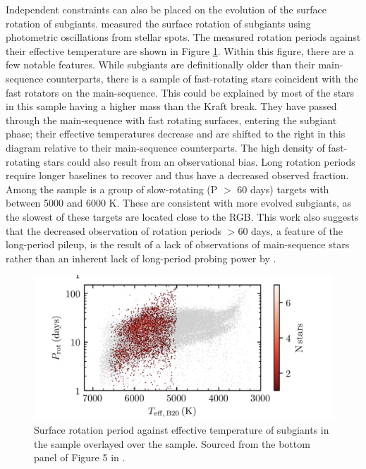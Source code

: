Independent constraints can also be placed on the evolution of the surface rotation of subgiants.
\citet{santos_surface_2021} measured the surface rotation of  subgiants using photometric oscillations from stellar spots.
The measured rotation periods against their effective temperature are shown in Figure \ref{fig:subgiant_surface}.
Within this figure, there are a few notable features.
While subgiants are definitionally older than their main-sequence counterparts, there is a sample of fast-rotating stars coincident with the fast rotators on the main-sequence.
This could be explained by most of the stars in this sample having a higher mass than the Kraft break.
They have passed through the main-sequence with fast rotating surfaces, entering the subgiant phase; their effective temperatures decrease and are shifted to the right in this diagram relative to their main-sequence counterparts.
The high density of fast-rotating stars could also result from an observational bias.
Long rotation periods require longer baselines to recover and thus have a decreased observed fraction.
Among the sample is a group of slow-rotating (P $>$ 60 days) targets with \teff{} between 5000 and 6000 K.
These are consistent with more evolved subgiants, as the slowest of these targets are located close to the RGB.
This work also suggests that the decreased observation of rotation periods $>$60 days, a feature of the long-period pileup, is the result of a lack of observations of main-sequence stars rather than an inherent lack of long-period probing power by \kepler. 

\begin{figure}[h]
    \includegraphics[width=\textwidth]{Figures/intro_figures/subgiant_surface.png}
    \caption[Surface rotation period distribution of subgiant stars.]{Surface rotation period against effective temperature of subgiants in the \citet{santos_surface_2021} sample overlayed over the \kepler{} \citet{mcquillan_rotation_2014} sample. 
    Sourced from the bottom panel of Figure 5 in \citet{santos_surface_2021}.}
    \label{fig:subgiant_surface}
\end{figure}

